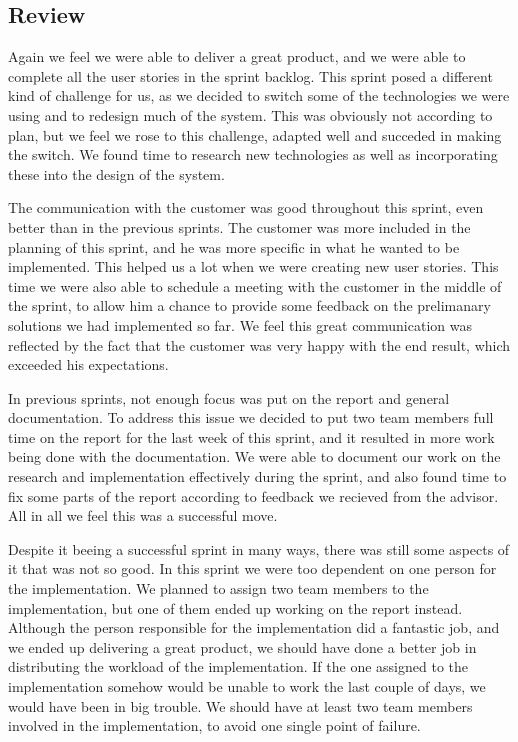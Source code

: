 \subsection{Review}
Again we feel we were able to deliver a great product, and we were able to complete all the user stories in the sprint backlog. This sprint posed a different kind of challenge for us, as we decided to switch some of the technologies we were using and to redesign much of the system. This was obviously not according to plan, but we feel we rose to this challenge, adapted well and succeded in making the switch. We found time to research new technologies as well as incorporating these into the design of the system.


The communication with the customer was good throughout this sprint, even better than in the previous sprints. The customer was more included in the planning of this sprint, and he was more specific in what he wanted to be implemented. This helped us a lot when we were creating new user stories. This time we were also able to schedule a meeting with the customer in the middle of the sprint, to allow him a chance to provide some feedback on the prelimanary solutions we had implemented so far. We feel this great communication was reflected by the fact that the customer was very happy with the end result, which exceeded his expectations.


In previous sprints, not enough focus was put on the report and general documentation. To address this issue we decided to put two team members full time on the report for the last week of this sprint, and it resulted in more work being done with the documentation. We were able to document our work on the research and implementation effectively during the sprint, and also found time to fix some parts of the report according to feedback we recieved from the advisor. All in all we feel this was a successful move.


Despite it beeing a successful sprint in many ways, there was still some aspects of it that was not so good. In this sprint we were too dependent on one person for the implementation. We planned to assign two team members to the implementation, but one of them ended up working on the report instead. Although the person responsible for the implementation did a fantastic job, and we ended up delivering a great product, we should have done a better job in distributing the workload of the implementation. If the one assigned to the implementation somehow would be unable to work the last couple of days, we would have been in big trouble. We should have at least two team members involved in the implementation, to avoid one single point of failure.


